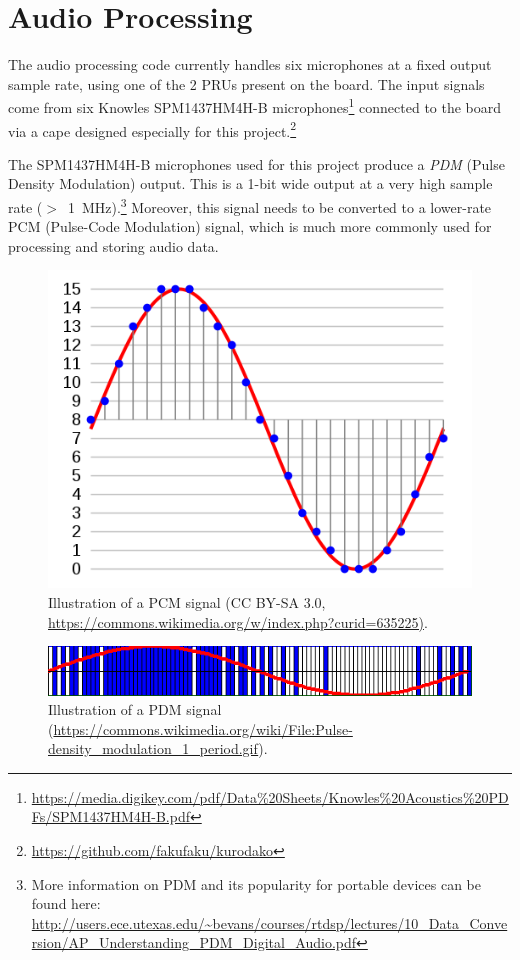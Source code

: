 \documentclass[]{report}
\begin{document}
\hypertarget{audio-processing}{%
\section{Audio Processing}\label{audio-processing}}

The audio processing code currently handles six microphones at a fixed output sample rate, using one of the 2 PRUs present on the board. The input signals come from six Knowles SPM1437HM4H-B microphones\footnote{\url{https://media.digikey.com/pdf/Data\%20Sheets/Knowles\%20Acoustics\%20PDFs/SPM1437HM4H-B.pdf}} connected to the board via a cape designed especially for this project.\footnote{\url{https://github.com/fakufaku/kurodako}}

The SPM1437HM4H-B microphones used for this project produce a \emph{PDM} (Pulse Density Modulation) output. This is a 1-bit wide output at a very high sample rate ($ > $~1~MHz).\footnote{More information on PDM and its popularity for portable devices can be found here: \url{http://users.ece.utexas.edu/~bevans/courses/rtdsp/lectures/10_Data_Conversion/AP_Understanding_PDM_Digital_Audio.pdf}} Moreover, this signal needs to be converted to a lower-rate PCM (Pulse-Code Modulation) signal, which is much more commonly used for processing and storing audio data.

\begin{figure}[H]
\centering
\includegraphics[width=0.7\linewidth]{Pictures/PCM.png}
\caption{Illustration of a PCM signal (CC BY-SA 3.0, \url{https://commons.wikimedia.org/w/index.php?curid=635225)}.}
\end{figure}

\begin{figure}[H]
\centering
\includegraphics[width=1.0\linewidth]{Pictures/PDM.png}
\caption{Illustration of a PDM signal (\url{https://commons.wikimedia.org/wiki/File:Pulse-density_modulation_1_period.gif}).}
\end{figure}
\end{document}

